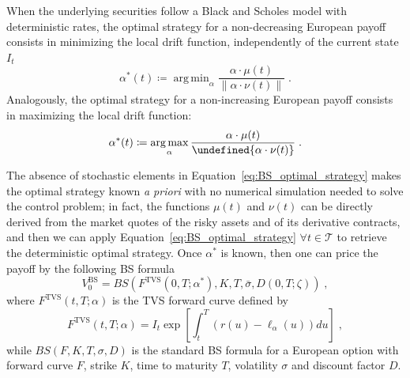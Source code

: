 \documentclass[runningheads]{m2ef}
\DeclareMathOperator*{\argmax}{arg\,max}
\DeclareMathOperator*{\argmin}{arg\,min}
\let\norm\undefined %
\DeclarePairedDelimiter\norm{\lVert}{\rVert}
\begin{document}
	\begin{proposition}\label{prop:bs}
	When the underlying securities follow a Black and Scholes model with deterministic rates, the optimal strategy for a non-decreasing European payoff consists in minimizing the local drift function, independently of the current state $I_t$
	\begin{equation}
		\alpha^*(t) \coloneqq \argmin_\alpha \frac{\alpha \cdot \mu(t)}{\|\alpha \cdot \nu(t) \|} \; .
	\label{eq:BS_optimal_strategy}
	\end{equation}
	Analogously, the optimal strategy for a non-increasing European payoff consists in maximizing the local drift function:
	\begin{equation}
		\alpha^*(t) \coloneqq \argmax_\alpha \frac{\alpha \cdot \mu(t)}{\norm{\alpha \cdot \nu(t)}} \; .
	\label{eq:BS_optimal_strategy_put}
	\end{equation}
	\end{proposition}
	The absence of stochastic elements in Equation~\eqref{eq:BS_optimal_strategy} makes the optimal strategy known \textit{a priori} with no numerical simulation needed to solve the control problem; in fact, the functions $\mu(t)$ and $\nu(t)$ can be directly derived from the market quotes of the risky assets and of its derivative contracts, and then we can apply Equation~\eqref{eq:BS_optimal_strategy} $\forall t \in \mathcal{T}$  to retrieve the deterministic optimal strategy. Once $\alpha^*$ is known, then one can price the payoff by the following BS formula
	\begin{equation}
		V_0^{\text{BS}} = BS(F^{\text{TVS}}(0,T;\alpha^*), K, T, \bar{\sigma}, D(0,T;\zeta)) \; ,
	\label{eq:bs_closed_solution}\end{equation}
	where $F^{\text{TVS}}(t,T;\alpha)$ is the TVS forward curve defined by
	\begin{equation}
		F^{\text{TVS}}(t,T;\alpha) = I_t \exp\left[\int_t^T\left(r(u)-\ell_{\alpha} \left(u\right)\right)du\right] \; ,
	\label{eq:tvs_forward}\end{equation}
	while $BS(F,K,T,\sigma,D)$ is the standard BS formula for a European option with forward curve $F$, strike $K$, time to maturity $T$, volatility $\sigma$ and discount factor $D$. 
\end{document}
